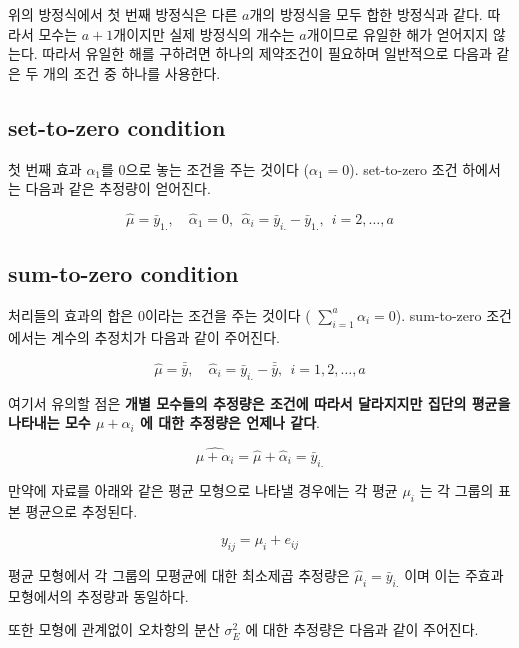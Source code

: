 \documentclass[
]{book}
\theoremstyle{definition}
\theoremstyle{definition}
\theoremstyle{definition}
\theoremstyle{definition}
\theoremstyle{remark}
\begin{document}
위의 방정식에서 첫 번째 방정식은 다른 \(a\)개의 방정식을 모두 합한 방정식과 같다. 따라서 모수는 \(a+1\)개이지만 실제 방정식의 개수는 \(a\)개이므로
유일한 해가 얻어지지 않는다. 따라서 유일한 해를 구하려면 하나의 제약조건이 필요하며 일반적으로 다음과 같은 두 개의 조건 중 하나를 사용한다.

\hypertarget{set-to-zero-condition}{%
\subsection{set-to-zero condition}\label{set-to-zero-condition}}

첫 번째 효과 \(\alpha_1\)를 0으로 놓는 조건을 주는 것이다 (\(\alpha_1=0\)). set-to-zero 조건 하에서는 다음과 같은 추정량이 얻어진다.

\begin{equation}
\hat \mu = \bar {y}_{1.}, \quad \hat \alpha_1=0, ~~  \hat \alpha_i = \bar {y}_{i.} -\bar {y}_{1.},~~i=2,\dots,a
\label{eq:setzeroest}
\end{equation}

\hypertarget{sum-to-zero-condition}{%
\subsection{sum-to-zero condition}\label{sum-to-zero-condition}}

처리들의 효과의 합은 0이라는 조건을 주는 것이다 ( \(\sum_{i=1}^a \alpha_i=0\)). sum-to-zero 조건에서는 계수의 추정치가 다음과 같이 주어진다.

\begin{equation}
\hat \mu = \bar {\bar {y}}, \quad \hat \alpha_i = \bar {y}_{i.} -\bar {\bar {y}},~~i=1,2,\dots,a 
\label{eq:sumzeroest}
\end{equation}

여기서 유의할 점은 \textbf{개별 모수들의 추정량은 조건에 따라서 달라지지만 집단의 평균을 나타내는 모수 \(\mu+ \alpha_i\) 에 대한 추정량은 언제나 같다}.

\[ \widehat{\mu+ \alpha_i} = \hat \mu + \hat {\alpha}_i =  \bar {y}_{i.} \]

만약에 자료를 아래와 같은 평균 모형으로 나타낼 경우에는 각 평균 \(\mu_i\) 는 각 그룹의 표본 평균으로 추정된다.

\[ y_{ij} = \mu_i + e_{ij} \]

평균 모형에서 각 그룹의 모평균에 대한 최소제곱 추정량은 \(\hat \mu_i = \bar {y}_{i.}\) 이며 이는 주효과 모형에서의 추정량과 동일하다.

또한 모형에 관계없이 오차항의 분산 \(\sigma_E^2\) 에 대한 추정량은 다음과 같이 주어진다.
\end{document}
